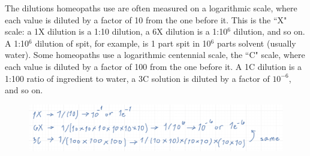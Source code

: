 \documentclass[12pt]{article}
\begin{document}
\noindent The dilutions homeopaths use are often measured on a logarithmic scale, where each value is diluted by a factor of 10 from the one before it. This is the ``X" scale: a 1X dilution is a 1:10 dilution, a 6X dilution is a 1:10$^6$ dilution, and so on. A 1:10$^6$ dilution of spit, for example, is 1 part spit in 10$^{6}$ parts solvent (usually water). Some homeopaths use a logarithmic centennial scale, the ``C" scale, where each value is diluted by a factor of 100 from the one before it. A 1C dilution is a 1:100 ratio of ingredient to water, a 3C solution is diluted by a factor of $10^{-6}$, and so on.

\begin{figure}[h!]
\begin{center}
\includegraphics[trim=1cm 1cm 1cm 0cm, width=5in]{units.png}
\end{center}
\end{figure}
\end{document}
